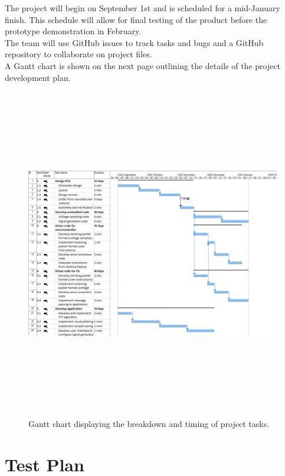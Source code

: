\documentclass[letterpaper,12pt]{article}
\begin{document}
\noindent
The project will begin on September 1st and is scheduled for a mid-January
finish. This schedule will allow for final testing of the product before the
prototype demonstration in February. \\

\noindent
The team will use GitHub issues to track tasks and bugs and a GitHub repository
to collaborate on project files. \\

\noindent
A Gantt chart is shown on the next page outlining the details of the project
development plan. \\

\begin{landscape}
\thispagestyle{empty}
\begin{figure}[h!]
    \centering
    \includegraphics[height=14.5cm]{figures/gantt}
    \caption{Gantt chart displaying the breakdown and timing of project tasks.}
    \label{fig:gantt}
\end{figure}
\vfill
\raisebox{-0pt}{\makebox[\linewidth]{\thepage}}
\end{landscape}

\section{Test Plan}
\end{document}
